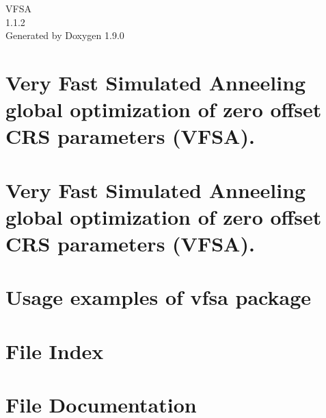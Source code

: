 \let\mypdfximage\pdfximage\def\pdfximage{\immediate\mypdfximage}\documentclass[twoside]{book}
\newcommand{\+}{\discretionary{\mbox{\scriptsize$\hookleftarrow$}}{}{}}
\newcommand{\clearemptydoublepage}{%
  \newpage{\pagestyle{empty}\cleardoublepage}%
}
\begin{document}
\raggedbottom

\hypersetup{pageanchor=false,
             bookmarksnumbered=true,
             pdfencoding=unicode
            }
\begin{titlepage}
\vspace*{7cm}
\begin{center}%
{\Large VFSA \\[1ex]\large 1.\+1.\+2 }\\
\vspace*{1cm}
{\large Generated by Doxygen 1.9.0}\\
\end{center}
\end{titlepage}
\clearemptydoublepage
{}
\tableofcontents
\clearemptydoublepage
{}
\hypersetup{pageanchor=true}

\chapter{Very Fast Simulated Anneeling global optimization of zero offset CRS parameters (VFSA).}
\label{md__home_dirack_madagascar-3_80_user_vfsa__r_e_a_d_m_e}

\chapter{Very Fast Simulated Anneeling global optimization of zero offset CRS parameters (VFSA).}
\label{md__r_e_a_d_m_e2}

\chapter{Usage examples of vfsa package}
\label{md__home_dirack_madagascar-3_80_user_vfsa_usage_examples__r_e_a_d_m_e}

\chapter{File Index}

\chapter{File Documentation}


\backmatter
\newpage
{}
\clearemptydoublepage
{}
\printindex
\end{document}
